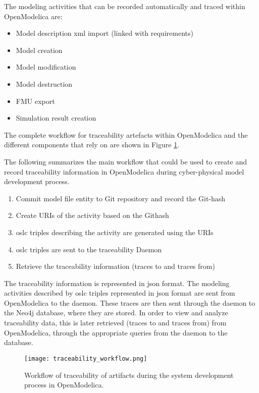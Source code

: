 The modeling activities that can be recorded automatically and traced within OpenModelica are:

\begin{itemize}
\item Model description \acrshort{xml} import (linked with requirements)
\item Model creation
\item Model modification
\item Model destruction
\item FMU export
\item Simulation result creation

\end{itemize}
The complete workflow for traceability artefacts within OpenModelica and the different components that rely on are shown in Figure \ref{fig:traceabilityworkflow}.

The following summarizes the main workflow that could be used to create and record traceability
information in OpenModelica during cyber-physical model development process.

\begin{enumerate}
\item Commit model file entity to Git repository and record the Git-hash
\item Create URIs of the activity based on the Git\-hash
\item \acrshort{oslc} triples describing the activity are generated using the URIs
\item \acrshort{oslc} triples are sent to the traceability Daemon
\item Retrieve the traceability information (traces to and traces from)

\end{enumerate}

The traceability information is represented in \acrshort{json} format. The modeling activities described by \acrshort{oslc}
triples represented in \acrshort{json} format are sent from OpenModelica to the daemon. These traces are then
sent through the daemon to the Neo4j database, where they are stored. In order to view and analyze
traceability data, this is later retrieved (traces to and traces from) from OpenModelica, through the
appropriate queries from the daemon to the database. 

\begin{figure}
	\texttt{[image: traceability\_workflow.png]}
	\caption{Workflow of traceability of artifacts during the system development process in OpenModelica.}
	\label{fig:traceabilityworkflow}
\end{figure}



